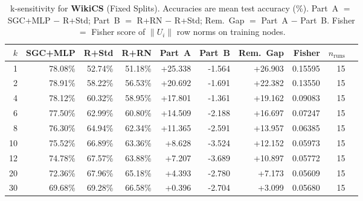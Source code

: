 \begin{table}[t]
\centering\small\setlength{\tabcolsep}{5pt}
\caption{k-sensitivity for \textbf{WikiCS} (Fixed Splits). Accuracies are mean test accuracy (\%). Part~A $=$ SGC+MLP $-$ R+Std; Part~B $=$ R+RN $-$ R+Std; Rem.~Gap $=$ Part~A $-$ Part~B. Fisher $=$ Fisher score of $\|U_i\|$ row norms on training nodes.}
\label{tab:exp8_per_dataset_wikics_fixed}
\begin{tabular}{rrrrrrrrrr}
\toprule
$k$ & SGC+MLP & R+Std & R+RN & Part~A & Part~B & Rem.~Gap & Fisher & $n_{\mathrm{runs}}$ \\
\midrule
1 & 78.08\% & 52.74\% & 51.18\% & +25.338 & -1.564 & +26.903 & 0.15595 & 15 \\
2 & 78.91\% & 58.22\% & 56.53\% & +20.692 & -1.691 & +22.382 & 0.13550 & 15 \\
4 & 78.12\% & 60.32\% & 58.95\% & +17.801 & -1.361 & +19.162 & 0.09083 & 15 \\
6 & 77.50\% & 62.99\% & 60.80\% & +14.509 & -2.188 & +16.697 & 0.07247 & 15 \\
8 & 76.30\% & 64.94\% & 62.34\% & +11.365 & -2.591 & +13.957 & 0.06385 & 15 \\
10 & 75.52\% & 66.89\% & 63.36\% & +8.628 & -3.524 & +12.152 & 0.05973 & 15 \\
12 & 74.78\% & 67.57\% & 63.88\% & +7.207 & -3.689 & +10.897 & 0.05772 & 15 \\
20 & 72.36\% & 67.96\% & 65.18\% & +4.393 & -2.780 & +7.173 & 0.05609 & 15 \\
30 & 69.68\% & 69.28\% & 66.58\% & +0.396 & -2.704 & +3.099 & 0.05680 & 15 \\
\bottomrule
\end{tabular}
\end{table}
